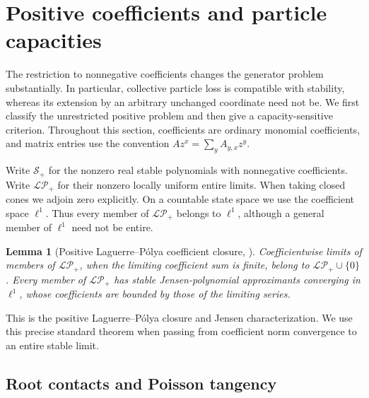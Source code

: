 \documentclass[reqno]{amsart}
\newtheorem{lemma}[theorem]{Lemma}
\theoremstyle{definition}
\theoremstyle{remark}
\begin{document}

\section{Positive coefficients and particle capacities}
\label{pos:section}

The restriction to nonnegative coefficients changes the generator problem substantially.
In particular, collective particle loss is compatible with stability, whereas its extension
by an arbitrary unchanged coordinate need not be.  We first classify the unrestricted
positive problem and then give a capacity-sensitive criterion.  Throughout this section,
coefficients are ordinary monomial coefficients, and matrix entries use the convention
\(Az^x=\sum_y A_{y,x}z^y\).

Write \(\mathcal S_+\) for the nonzero real stable polynomials with nonnegative
coefficients.  Write \(\mathcal{LP}_+\) for their nonzero locally uniform entire limits.
When taking closed cones we adjoin zero explicitly.  On a countable state space we use
the coefficient space \(\ell^1\).  Thus every member of \(\mathcal{LP}_+\) belongs to
\(\ell^1\), although a general member of \(\ell^1\) need not be entire.
\begin{lemma}[Positive Laguerre--P\'olya coefficient closure, \cite{LVR10}]\label{pos:lp-closure}
Coefficientwise limits of members of \(\mathcal{LP}_+\), when the limiting
coefficient sum is finite, belong to \(\mathcal{LP}_+\cup\{0\}\).
Every member of \(\mathcal{LP}_+\) has stable Jensen-polynomial approximants
converging in \(\ell^1\), whose coefficients are bounded by those of the
limiting series.
\end{lemma}
This is the positive Laguerre--P\'olya closure and Jensen characterization.
We use this precise standard theorem when passing from coefficient norm convergence
to an entire stable limit.

\subsection{Root contacts and Poisson tangency}
\end{document}
